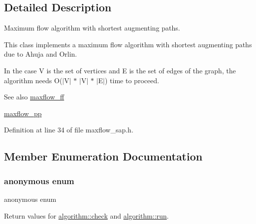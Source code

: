 \subsection{Detailed Description}
Maximum flow algorithm with shortest augmenting paths. 

This class implements a maximum flow algorithm with shortest augmenting paths due to Ahuja and Orlin.

In the case V is the set of vertices and E is the set of edges of the graph, the algorithm needs O($\vert$\+V$\vert$ $\ast$ $\vert$\+V$\vert$ $\ast$ $\vert$\+E$\vert$) time to proceed.

\begin{DoxySeeAlso}{See also}
\mbox{\hyperlink{classmaxflow__ff}{maxflow\+\_\+ff}} 

\mbox{\hyperlink{classmaxflow__pp}{maxflow\+\_\+pp}} 
\end{DoxySeeAlso}


Definition at line 34 of file maxflow\+\_\+sap.\+h.



\subsection{Member Enumeration Documentation}
\mbox{\label{classalgorithm_af1a0078e153aa99c24f9bdf0d97f6710}} 
\subsubsection{\texorpdfstring{anonymous enum}{anonymous enum}}
{\footnotesize\ttfamily anonymous enum\hspace{0.3cm}{\ttfamily [inherited]}}



Return values for \mbox{\hyperlink{classalgorithm_a76361fb03ad1cf643affc51821e43bed}{algorithm\+::check}} and \mbox{\hyperlink{classalgorithm_a734b189509a8d6b56b65f8ff772d43ca}{algorithm\+::run}}. 

